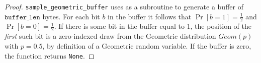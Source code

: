 \documentclass{article}
\begin{document}
\begin{proof}
    \texttt{sample\_geometric\_buffer} uses  as a subroutine to generate a buffer of $\texttt{buffer\_len}$ bytes.
    For each bit $b$ in the buffer it follows that $\Pr[b = 1] = \frac{1}{2}$ and $\Pr[b = 0] = \frac{1}{2}$. 
    If there is some bit in the buffer equal to $1$, 
    the position of the \emph{first} such bit is a zero-indexed draw from the Geometric distribution $Geom(p)$ with $p = 0.5$,
    by definition of a Geometric random variable. 
    If the buffer is zero, the function returns \texttt{None}. 
\end{proof}
\end{document}
